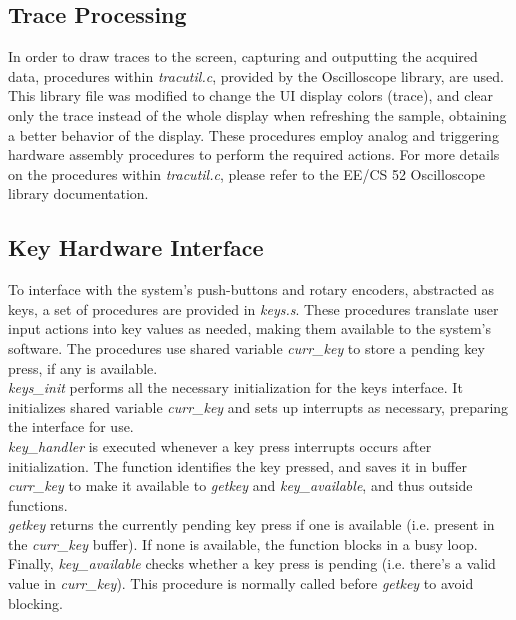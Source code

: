 \documentclass[titlepage]{scrartcl}
\begin{document}
	\subsection{Trace Processing}
	In order to draw traces to the screen, capturing and outputting the acquired data, procedures within \textit{tracutil.c}, provided by the Oscilloscope library, are used. This library file was modified to change the UI display colors (trace), and clear only the trace instead of the whole display when refreshing the sample, obtaining a better behavior of the display. These procedures employ analog and triggering hardware assembly procedures to perform the required actions. For more details on the procedures within \textit{tracutil.c}, please refer to the EE/CS 52 Oscilloscope library documentation.\\

	\subsection{Key Hardware Interface}
	To interface with the system's push-buttons and rotary encoders, abstracted as keys, a set of procedures are provided in \textit{keys.s}. These procedures translate user input actions into key values as needed, making them available to the system's software. The procedures use shared variable \textit{curr\_key} to store a pending key press, if any is available.\\

	\textit{keys\_init} performs all the necessary initialization for the keys interface. It initializes shared variable \textit{curr\_key} and sets up interrupts as necessary, preparing the interface for use.\\

	\textit{key\_handler} is executed whenever a key press interrupts occurs after initialization. The function identifies the key pressed, and saves it in buffer \textit{curr\_key} to make it available to \textit{getkey} and \textit{key\_available}, and thus outside functions.\\

	\textit{getkey} returns the currently pending key press if one is available (i.e. present in the \textit{curr\_key} buffer). If none is available, the function blocks in a busy loop.\\

	Finally, \textit{key\_available} checks whether a key press is pending (i.e. there's a valid value in \textit{curr\_key}). This procedure is normally called before \textit{getkey} to avoid blocking.\\
\end{document}
